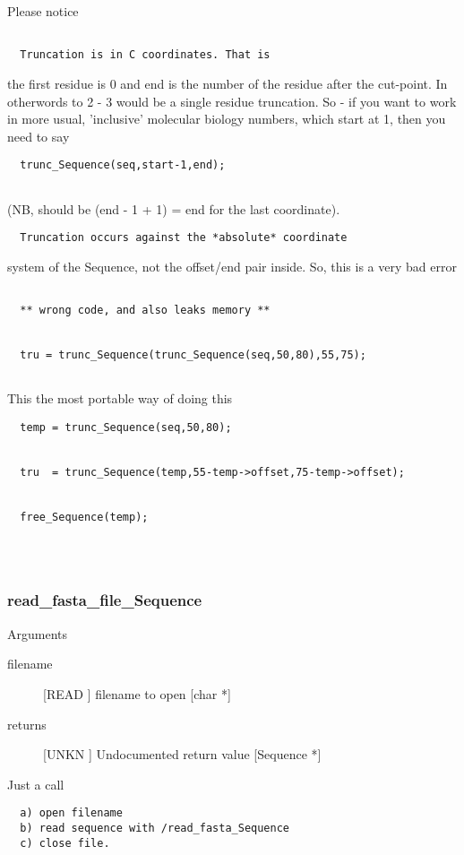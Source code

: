 Please notice
\begin{verbatim}
  
  Truncation is in C coordinates. That is
\end{verbatim}
the first residue is 0 and end is the number of the
residue after the cut-point. In otherwords to 
2 - 3 would be a single residue truncation. So - if
you want to work in more usual, 'inclusive' molecular
biology numbers, which start at 1, then you need to say


\begin{verbatim}
  trunc_Sequence(seq,start-1,end);


\end{verbatim}
(NB, should be (end - 1 + 1) = end for the last coordinate).


\begin{verbatim}
  Truncation occurs against the *absolute* coordinate
\end{verbatim}
system of the Sequence, not the offset/end pair inside.
So, this is a very bad error
\begin{verbatim}
 
  ** wrong code, and also leaks memory **


  tru = trunc_Sequence(trunc_Sequence(seq,50,80),55,75); 


\end{verbatim}
This the most portable way of doing this


\begin{verbatim}
  temp = trunc_Sequence(seq,50,80);


  tru  = trunc_Sequence(temp,55-temp->offset,75-temp->offset);


  free_Sequence(temp);




\end{verbatim}
\subsubsection{read_fasta_file_Sequence}

Arguments
\begin{description}
\item[filename] [READ ] filename to open  [char *]
\item[returns] [UNKN ] Undocumented return value [Sequence *]
\end{description}
Just a call
\begin{verbatim}
  a) open filename
  b) read sequence with /read_fasta_Sequence
  c) close file.


\end{verbatim}
